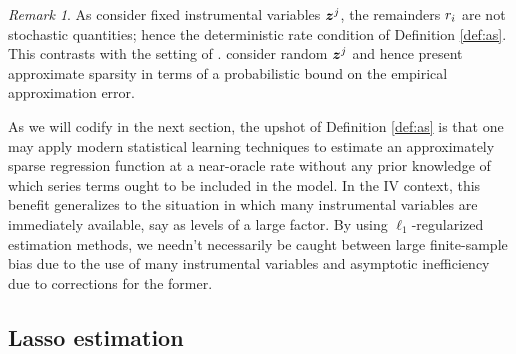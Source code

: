 \documentclass{uwstat572}
\theoremstyle{definition}
\theoremstyle{remark}
\newtheorem{rek}[thm]{Remark}
\newcommand{\bs}[1]{\boldsymbol{#1}}
\numberwithin{equation}{section}
\begin{document}
\begin{rek} As \cite{BCH11} consider fixed instrumental variables $\z^j$, the remainders $r_i$ are not stochastic quantities; hence the deterministic rate condition of Definition \ref{def:as}. This contrasts with the setting of \cite{N97}. \cite{BCCH12} consider random $\z^j$ and hence present approximate sparsity in terms of a probabilistic bound on the empirical approximation error. 
\end{rek}

As we will codify in the next section, the upshot of Definition \ref{def:as} is that one may apply modern statistical learning techniques to estimate an approximately sparse regression function at a near-oracle rate without any prior knowledge of which series terms ought to be included in the model. In the IV context, this benefit generalizes to the situation in which many instrumental variables are immediately available, say as levels of a large factor. By using $\ell_1$-regularized estimation methods, we needn't necessarily be caught between large finite-sample bias due to the use of many instrumental variables and asymptotic inefficiency due to corrections for the former.  


%
% 
\subsection{Lasso estimation}
\newcommand{\minse}{\phi_{\mathrm{min}}}
\newcommand{\maxse}{\phi_{\mathrm{max}}}
\newcommand{\cminse}{\kappa_*}
\newcommand{\cmaxse}{\kappa^*}
\newcommand{\M}{\bs{M}}
\newcommand{\gd}{\delta}
\newcommand{\diff}{\bs{\gd}}
\end{document}

